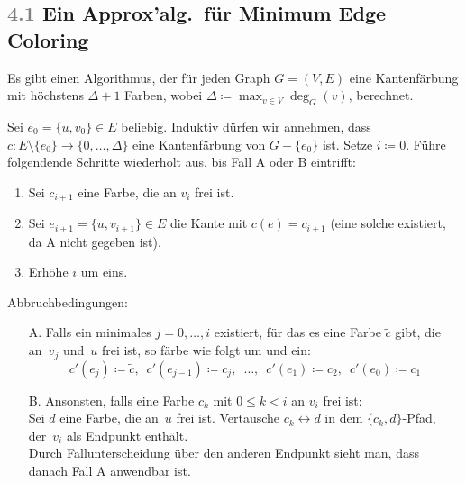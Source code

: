 \documentclass{cheat-sheet}
\newcommand{\Youtube}[1]{\href{https://www.youtube.com/watch?v=#1}{\textcolor{YoutubeColor}{$\blacktriangleright$}}}
\newcommand{\Algorithm}[1]{\textcolor{AlgorithmColor}{\textbf{#1}}}
\newcommand{\Problem}[1]{\textcolor{ProblemColor}{\textbf{#1}}}
\newcommand{\scriptSection}[1]{\textcolor{gray}{#1}\enspace}
\begin{document}

\subsection{\scriptSection{4.1} Ein Approx'alg.\ für \Problem{Minimum Edge Coloring}}

\begin{satz}[\Algorithm{Vizings Algorithmus}, \Youtube{otky1bBhwgM}]
  Es gibt einen Algorithmus, der für jeden Graph $G = (V, E)$ eine Kantenfärbung mit höchstens $\Delta + 1$ Farben, wobei $\Delta \coloneqq {\max}_{v \in V} \deg_G(v)$, berechnet.
\end{satz}

\begin{alg}
  Sei $e_0 = \{ u, v_0 \} \in E$ beliebig.
  Induktiv dürfen wir annehmen, dass $c : E \setminus \{ e_0 \} \to \{ 0, \ldots, \Delta \}$ eine Kantenfärbung von $G - \{ e_0 \}$ ist.
  Setze $i \coloneqq 0$.
  Führe folgendende Schritte wiederholt aus, bis Fall A oder B eintrifft:

  \begin{enumerate}
    \item Sei $c_{i+1}$ eine Farbe, die an $v_i$ frei ist.
    \item Sei $e_{i+1} = \{ u, v_{i+1} \} \in E$ die Kante mit $c(e) = c_{i+1}$ (eine solche existiert, da A nicht gegeben ist).
    \item Erhöhe $i$ um eins.
  \end{enumerate}

  Abbruchbedingungen:
  \begin{enumerate}
    \item[A.] Falls ein minimales $j = 0, \ldots, i$ existiert, für das es eine Farbe $\tilde{c}$ gibt, die an~$v_j$ und~$u$ frei ist, so färbe wie folgt um und ein:
    \[
      c'(e_j) \coloneqq \tilde{c}, \enspace
      c'(e_{j-1}) \coloneqq c_j, \enspace
      \ldots, \enspace
      c'(e_1) \coloneqq c_2, \enspace
      c'(e_0) \coloneqq c_1
   \]
    \item[B.]
      Ansonsten, falls eine Farbe $c_k$ mit $0 \leq k < i$ an $v_i$ frei ist: \\
      Sei $d$ eine Farbe, die an~$u$ frei ist.
      Vertausche $c_k \leftrightarrow d$ in dem $\{ c_k, d \}$-Pfad, der~$v_i$ als Endpunkt enthält. \\
      Durch Fallunterscheidung über den anderen Endpunkt sieht man, dass danach Fall A anwendbar ist.
  \end{enumerate}
\end{alg}
\end{document}
